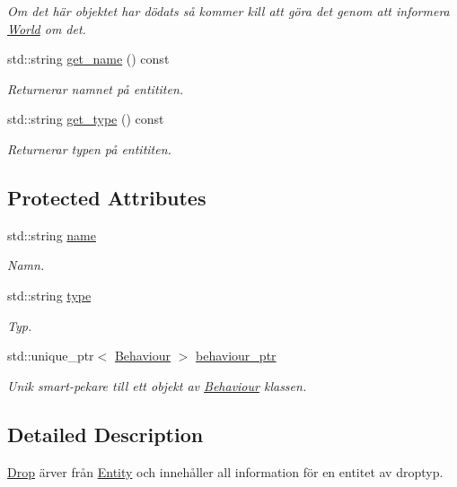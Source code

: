 \begin{DoxyCompactItemize}
\begin{DoxyCompactList}\small\item\em Om det här objektet har dödats så kommer kill att göra det genom att informera \hyperlink{classWorld}{World} om det. \end{DoxyCompactList}\item 
std\+::string \hyperlink{classEntity_a75c7e4aad3df2e053ee5b43169509534}{get\+\_\+name} () const 
\begin{DoxyCompactList}\small\item\em Returnerar namnet på entititen. \end{DoxyCompactList}\item 
std\+::string \hyperlink{classEntity_a0e9ef479c1147e21e5bcb338cb858df2}{get\+\_\+type} () const 
\begin{DoxyCompactList}\small\item\em Returnerar typen på entititen. \end{DoxyCompactList}\end{DoxyCompactItemize}
\subsection*{Protected Attributes}
\begin{DoxyCompactItemize}
\item 
std\+::string \hyperlink{classEntity_a931b21fbdebb1a5963b4bcab5df128f5}{name}
\begin{DoxyCompactList}\small\item\em Namn. \end{DoxyCompactList}\item 
std\+::string \hyperlink{classEntity_a298a9ebf2474bb00874b5ff6a0d637ef}{type}
\begin{DoxyCompactList}\small\item\em Typ. \end{DoxyCompactList}\item 
std\+::unique\+\_\+ptr$<$ \hyperlink{classBehaviour}{Behaviour} $>$ \hyperlink{classEntity_adb6e36848db24e6d48e6d295e19d3972}{behaviour\+\_\+ptr}
\begin{DoxyCompactList}\small\item\em Unik smart-\/pekare till ett objekt av \hyperlink{classBehaviour}{Behaviour} klassen. \end{DoxyCompactList}\end{DoxyCompactItemize}


\subsection{Detailed Description}
\hyperlink{classDrop}{Drop} ärver från \hyperlink{classEntity}{Entity} och innehåller all information för en entitet av droptyp. 


